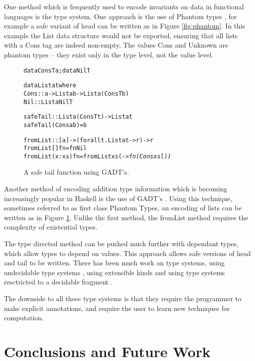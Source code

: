 \documentclass[preprint]{sigplanconf}
\newcommand{\C}[1]{\textsf{#1}}
\newenvironment{code}{\begin{alltt}\small}{\end{alltt}}
\begin{document}
One method which is frequently used to encode invariants on data in functional languages is the type system. One approach is the use of Phantom types \citep{fluet:phantom}, for example a safe variant of \C{head} can be written as in Figure \ref{fig:phantom}. In this example the \C{List} data structure would not be exported, ensuring that all lists with a \C{Cons} tag are indeed non-empty. The values \C{Cons} and \C{Unknown} are phantom types -- they exist only in the type level, not the value level.

\begin{figure}
\begin{code}
data ConsT a; data NilT

data List a t where
    Cons  :: a -> List a b -> List a (ConsT b)
    Nil   :: List a NilT

safeTail :: List a (ConsT t) -> List a t
safeTail (Cons a b) = b

fromList :: [a] -> (forall t. List a t -> r) -> r
fromList []      fn = fn Nil
fromList (x:xs)  fn = fromList xs (\sl -> fn (Cons x sl))
\end{code}
\caption{A safe \C{tail} function using GADT's.}
\label{fig:gadt}
\end{figure}

Another method of encoding addition type information which is becoming increasingly popular in Haskell is the use of GADT's \citep{gadt}. Using this technique, sometimes referred to as first class Phantom Types, an encoding of lists can be written as in Figure \ref{fig:gadt}. Unlike the first method, the \C{fromList} method requires the complexity of existential types.

The type directed method can be pushed much further with dependant types, which allow types to depend on values. This approach allows safe versions of \C{head} and \C{tail} to be written. There has been much work on type systems, using undecidable type systems \citep{cayenne, epigram}, using extensible kinds \citep{omega} and using type systems resctricted to a decidable fragment \citep{xi:dependent_practical}.

The downside to all these type systems is that they require the programmer to make explicit annotations, and require the user to learn new techniques for computation.


\section{Conclusions and Future Work}
\label{sec:conclusion}
\end{document}
